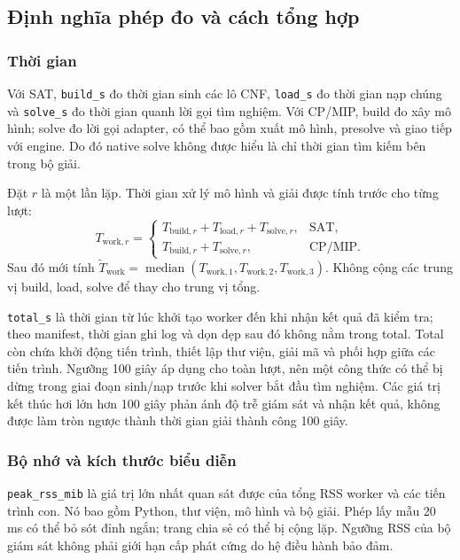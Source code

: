 \subsection{Định nghĩa phép đo và cách tổng hợp}
\subsubsection{Thời gian}
Với SAT, \texttt{build\_s} đo thời gian sinh các lô CNF, \texttt{load\_s} đo thời gian nạp chúng và \texttt{solve\_s} đo thời gian quanh lời gọi tìm nghiệm. Với CP/MIP, build đo xây mô hình; solve đo lời gọi adapter, có thể bao gồm xuất mô hình, presolve và giao tiếp với engine. Do đó native solve không được hiểu là chỉ thời gian tìm kiếm bên trong bộ giải.

Đặt $r$ là một lần lặp. Thời gian xử lý mô hình và giải được tính trước cho từng lượt:
\begin{equation}
T_{\mathrm{work},r}=\begin{cases}
T_{\mathrm{build},r}+T_{\mathrm{load},r}+T_{\mathrm{solve},r},&\text{SAT},\\
T_{\mathrm{build},r}+T_{\mathrm{solve},r},&\text{CP/MIP}.
\end{cases}
\end{equation}
Sau đó mới tính $\widetilde T_{\mathrm{work}}=\operatorname{median}(T_{\mathrm{work},1},T_{\mathrm{work},2},T_{\mathrm{work},3})$. Không cộng các trung vị build, load, solve để thay cho trung vị tổng.

\texttt{total\_s} là thời gian từ lúc khởi tạo worker đến khi nhận kết quả đã kiểm tra; theo manifest, thời gian ghi log và dọn dẹp sau đó không nằm trong total. Total còn chứa khởi động tiến trình, thiết lập thư viện, giải mã và phối hợp giữa các tiến trình. Ngưỡng 100 giây áp dụng cho toàn lượt, nên một công thức có thể bị dừng trong giai đoạn sinh/nạp trước khi solver bắt đầu tìm nghiệm. Các giá trị kết thúc hơi lớn hơn 100 giây phản ánh độ trễ giám sát và nhận kết quả, không được làm tròn ngược thành thời gian giải thành công 100 giây.

\subsubsection{Bộ nhớ và kích thước biểu diễn}
\texttt{peak\_rss\_mib} là giá trị lớn nhất quan sát được của tổng RSS worker và các tiến trình con. Nó bao gồm Python, thư viện, mô hình và bộ giải. Phép lấy mẫu 20 ms có thể bỏ sót đỉnh ngắn; trang chia sẻ có thể bị cộng lặp. Ngưỡng RSS của bộ giám sát không phải giới hạn cấp phát cứng do hệ điều hành bảo đảm.

